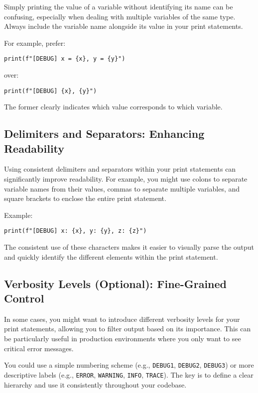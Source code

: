\documentclass{article}
\begin{document}
Simply printing the value of a variable without identifying its name can be confusing, especially when dealing with multiple variables of the same type.  Always include the variable name alongside its value in your print statements.

For example, prefer:

\begin{verbatim}
print(f"[DEBUG] x = {x}, y = {y}")
\end{verbatim}

over:

\begin{verbatim}
print(f"[DEBUG] {x}, {y}")
\end{verbatim}

The former clearly indicates which value corresponds to which variable.

\subsection*{Delimiters and Separators: Enhancing Readability}

Using consistent delimiters and separators within your print statements can significantly improve readability.  For example, you might use colons to separate variable names from their values, commas to separate multiple variables, and square brackets to enclose the entire print statement.

Example:

\begin{verbatim}
print(f"[DEBUG] x: {x}, y: {y}, z: {z}")
\end{verbatim}

The consistent use of these characters makes it easier to visually parse the output and quickly identify the different elements within the print statement.

\subsection*{Verbosity Levels (Optional): Fine-Grained Control}

In some cases, you might want to introduce different verbosity levels for your print statements, allowing you to filter output based on its importance.  This can be particularly useful in production environments where you only want to see critical error messages.

You could use a simple numbering scheme (e.g., \texttt{DEBUG1}, \texttt{DEBUG2}, \texttt{DEBUG3}) or more descriptive labels (e.g., \texttt{ERROR}, \texttt{WARNING}, \texttt{INFO}, \texttt{TRACE}).  The key is to define a clear hierarchy and use it consistently throughout your codebase.
\end{document}
